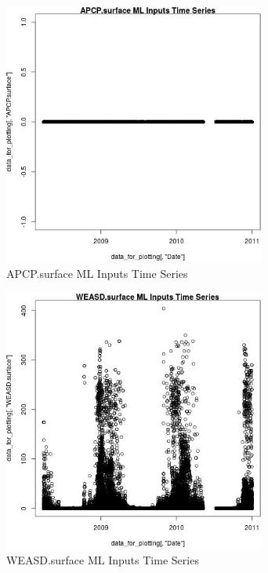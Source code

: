 \begin{figure} 
\centering  
\includegraphics[width=0.77\textwidth]{Code_Outputs/ML_input_report_ML_input_PM25_Step5_part_d_de_duplicated_aves_ML_input_APCPsurfacevDate.jpg} 
\caption{\label{fig:ML_input_report_ML_input_PM25_Step5_part_d_de_duplicated_aves_ML_inputAPCPsurfacevDate}APCP.surface ML Inputs Time Series} 
\end{figure} 
 

\begin{figure} 
\centering  
\includegraphics[width=0.77\textwidth]{Code_Outputs/ML_input_report_ML_input_PM25_Step5_part_d_de_duplicated_aves_ML_input_WEASDsurfacevDate.jpg} 
\caption{\label{fig:ML_input_report_ML_input_PM25_Step5_part_d_de_duplicated_aves_ML_inputWEASDsurfacevDate}WEASD.surface ML Inputs Time Series} 
\end{figure} 
 

